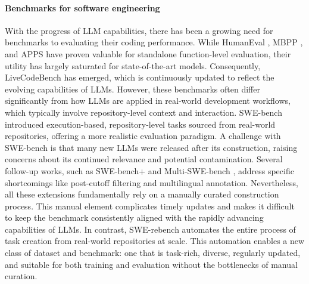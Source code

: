 \documentclass[dandb]{article}
\begin{document}
\paragraph{Benchmarks for software engineering} With the progress of LLM capabilities, there has been a growing need for benchmarks to evaluating their coding performance. While HumanEval \citep{chen2021evaluatinglargelanguagemodels}, MBPP \citep{austin2021programsynthesislargelanguage}, and APPS \citep{hendrycks2021measuringcodingchallengecompetence} have proven valuable for standalone function-level evaluation, their utility has largely saturated for state-of-the-art models. Consequently, LiveCodeBench \citep{jain2024livecodebenchholisticcontaminationfree} has emerged, which is continuously updated to reflect the evolving capabilities of LLMs. However, these benchmarks often differ significantly from how LLMs are applied in real-world development workflows, which typically involve repository-level context and interaction. SWE-bench \citep{jimenez2024swebench} introduced execution-based, repository-level tasks sourced from real-world repositories, offering a more realistic evaluation paradigm. A challenge with SWE-bench is that many new LLMs were released after its construction, raising concerns about its continued relevance and potential contamination. Several follow-up works, such as SWE-bench+ \citep{aleithan2024swebenchenhancedcodingbenchmark} and Multi-SWE-bench \citep{zan2025multiswebenchmultilingualbenchmarkissue}, address specific shortcomings like post-cutoff filtering and multilingual annotation. Nevertheless, all these extensions fundamentally rely on a manually curated construction process. This manual element complicates timely updates and makes it difficult to keep the benchmark consistently aligned with the rapidly advancing capabilities of LLMs. In contrast, SWE-rebench automates the entire process of task creation from real-world repositories at scale. This automation enables a new class of dataset and benchmark: one that is task-rich, diverse, regularly updated, and suitable for both training and evaluation without the bottlenecks of manual curation.
\end{document}
